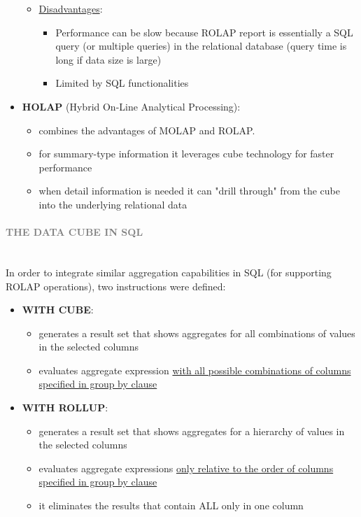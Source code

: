 \documentclass[10pt,a4paper]{article}
\newcommand{\myparagraph}[1]{\paragraph{\normalsize{\textcolor{gray}{\uppercase{\textbf{#1}}}} }\mbox{} \vspace{0.5em}\\}
\begin{document}
\begin{justify}
\begin{itemize}
\begin{itemize}
		\item \uline{Disadvantages}:
		\begin{itemize}
			\item Performance can be slow because ROLAP report is essentially a SQL query (or multiple queries) in the relational database (query time is long if data size is large)
			\item Limited by SQL functionalities
		\end{itemize}
	\end{itemize}		
	\item \textbf{HOLAP} (Hybrid On-Line Analytical Processing):
	\begin{itemize}
		\item combines the advantages of MOLAP and ROLAP.
		\item for summary-type information it leverages cube technology for faster performance
		\item when detail information is needed it can "drill through" from the cube into the underlying relational data
\end{itemize}	 
\end{itemize}
\myparagraph{The Data Cube in SQL}
In order to integrate similar aggregation capabilities in SQL (for supporting ROLAP operations), two instructions were defined:
\begin{itemize}
	\item \textbf{WITH CUBE}: 
	\begin{itemize}
		\item generates a result set that shows aggregates for all combinations of values in the selected columns
		\item evaluates aggregate expression \uline{with all possible combinations of columns specified in group by clause}
	\end{itemize}
	\item \textbf{WITH ROLLUP}:
	\begin{itemize}
		\item generates a result set that shows aggregates for a hierarchy of values in the selected columns
		\item evaluates aggregate expressions \uline{only relative to the order of columns specified in group by clause}
		\item it eliminates the results that contain ALL only in one column
	\end{itemize}		
\end{itemize}

\end{justify}
\end{document}
